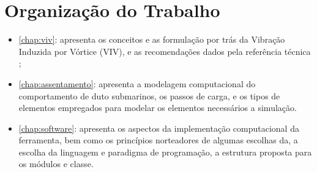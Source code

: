 \section{Organização do Trabalho}

\begin{itemize}
    \item \autoref{chap:viv}: apresenta os conceitos e as formulação por trás da Vibração Induzida por Vórtice (VIV), e as recomendações dados pela referência técnica ;
    \item \autoref{chap:assentamento}: apresenta a modelagem computacional do comportamento de duto submarinos, os passos de carga, e os tipos de elementos empregados para modelar os elementos necessários a simulação.
    \item \autoref{chap:software}: apresenta os aspectos da implementação computacional da ferramenta, bem como os princípios norteadores de algumas escolhas da, a escolha da linguagem e paradigma de programação, a estrutura proposta para os módulos e classe.
\end{itemize}